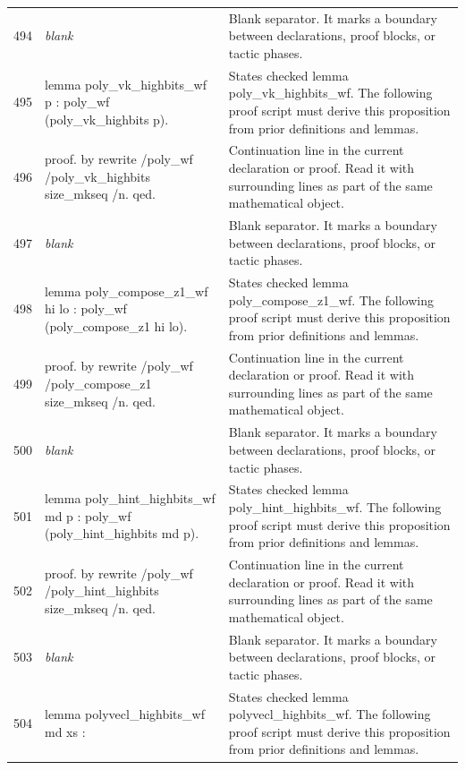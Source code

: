 \documentclass[10pt]{article}
\begin{document}
\begin{longtable}{r L{0.53\textwidth} L{0.37\textwidth}}
494 & {\ttfamily\scriptsize \emph{blank}} & Blank separator.  It marks a boundary between declarations, proof blocks, or tactic phases. \\
495 & {\ttfamily\scriptsize lemma poly\_vk\_highbits\_wf p : poly\_wf (poly\_vk\_highbits p).} & States checked lemma poly\_vk\_highbits\_wf.  The following proof script must derive this proposition from prior definitions and lemmas. \\
496 & {\ttfamily\scriptsize proof. by rewrite /poly\_wf /poly\_vk\_highbits size\_mkseq /n. qed.} & Continuation line in the current declaration or proof.  Read it with surrounding lines as part of the same mathematical object. \\
497 & {\ttfamily\scriptsize \emph{blank}} & Blank separator.  It marks a boundary between declarations, proof blocks, or tactic phases. \\
498 & {\ttfamily\scriptsize lemma poly\_compose\_z1\_wf hi lo : poly\_wf (poly\_compose\_z1 hi lo).} & States checked lemma poly\_compose\_z1\_wf.  The following proof script must derive this proposition from prior definitions and lemmas. \\
499 & {\ttfamily\scriptsize proof. by rewrite /poly\_wf /poly\_compose\_z1 size\_mkseq /n. qed.} & Continuation line in the current declaration or proof.  Read it with surrounding lines as part of the same mathematical object. \\
500 & {\ttfamily\scriptsize \emph{blank}} & Blank separator.  It marks a boundary between declarations, proof blocks, or tactic phases. \\
501 & {\ttfamily\scriptsize lemma poly\_hint\_highbits\_wf md p : poly\_wf (poly\_hint\_highbits md p).} & States checked lemma poly\_hint\_highbits\_wf.  The following proof script must derive this proposition from prior definitions and lemmas. \\
502 & {\ttfamily\scriptsize proof. by rewrite /poly\_wf /poly\_hint\_highbits size\_mkseq /n. qed.} & Continuation line in the current declaration or proof.  Read it with surrounding lines as part of the same mathematical object. \\
503 & {\ttfamily\scriptsize \emph{blank}} & Blank separator.  It marks a boundary between declarations, proof blocks, or tactic phases. \\
504 & {\ttfamily\scriptsize lemma polyvecl\_highbits\_wf md xs :} & States checked lemma polyvecl\_highbits\_wf.  The following proof script must derive this proposition from prior definitions and lemmas. \\

\end{longtable}
\end{document}
